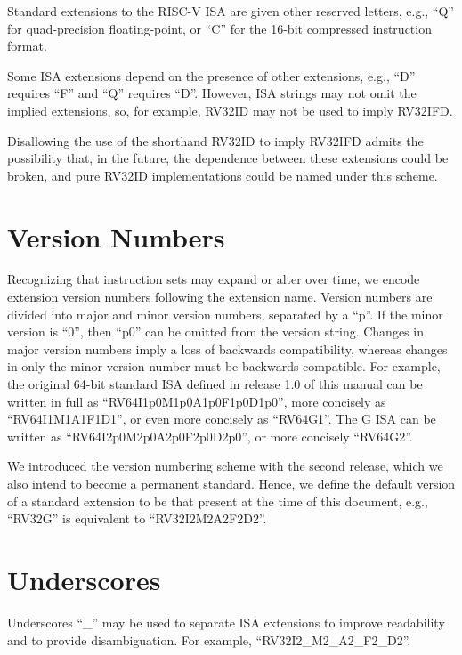 Standard extensions to the RISC-V ISA are given other reserved
letters, e.g., ``Q'' for quad-precision floating-point, or
``C'' for the 16-bit compressed instruction format.

Some ISA extensions depend on the presence of other extensions, e.g.,
``D'' requires ``F'' and ``Q'' requires ``D''.  However, ISA strings may not
omit the implied extensions, so, for example, RV32ID may not be used to imply RV32IFD.

\begin{commentary}
Disallowing the use of the shorthand RV32ID to imply RV32IFD admits the possibility
that, in the future, the dependence between these extensions could be broken, and
pure RV32ID implementations could be named under this scheme.
\end{commentary}

\section{Version Numbers}
Recognizing that instruction sets may expand or alter over time, we
encode extension version numbers following the extension name.  Version
numbers are divided into major and minor version numbers, separated by
a ``p''.  If the minor version is ``0'', then ``p0'' can be omitted
from the version string.  Changes in major version numbers imply a
loss of backwards compatibility, whereas changes in only the minor
version number must be backwards-compatible.  For example, the
original 64-bit standard ISA defined in release 1.0 of this manual can
be written in full as ``RV64I1p0M1p0A1p0F1p0D1p0'', more concisely as
``RV64I1M1A1F1D1'', or even more concisely as ``RV64G1''.  The G ISA
can be written as ``RV64I2p0M2p0A2p0F2p0D2p0'', or more
concisely ``RV64G2''.

We introduced the version numbering scheme with the second release,
which we also intend to become a permanent standard.  Hence, we define
the default version of a standard extension to be that present at the
time of this document, e.g., ``RV32G'' is equivalent to
``RV32I2M2A2F2D2''.

\section{Underscores}

Underscores ``\_'' may be used to separate ISA extensions to
improve readability and to provide disambiguation. For example, ``RV32I2\_M2\_A2\_F2\_D2''.

